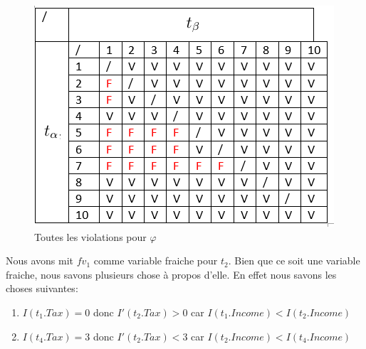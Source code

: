\documentclass[letterpaper, 12pt]{report}
\theoremstyle{definition}
\begin{document}
\begin{figure}
	\centering
	\includegraphics[scale=1]{img/TaxBad}
	\caption{\label{BadTax} Toutes les violations pour $\varphi$}
\end{figure}

Nous avons mit $fv_1$ comme variable fraiche pour $t_2$. Bien que ce soit une variable fraiche, nous savons plusieurs chose à propos d'elle. En effet nous savons les choses suivantes:
\begin{enumerate}

\item $I(t_1.Tax)=0$ donc $I'(t_2.Tax)>0$ car $I(t_1.Income)<I(t_2.Income)$
\item $I(t_4.Tax)=3$ donc $I'(t_2.Tax)<3$ car $I(t_2.Income)<I(t_4.Income)$

\end{enumerate}
\end{document}
